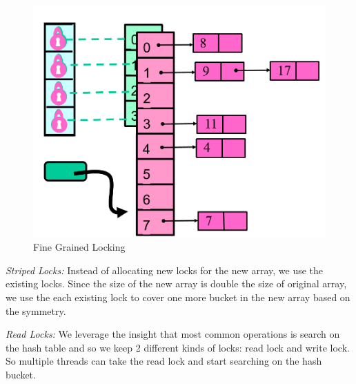 \documentclass[twoside]{article}
\begin{document}
\begin{figure}[h]
\centering
\includegraphics[scale=0.25]{Fine}
\caption{Fine Grained Locking}
\label{fig:1}
\end{figure}

\emph{Striped Locks:} Instead of allocating new locks for the new array, we use the existing locks. Since the size of the new array is double the size of original array, we use the each existing lock to cover one more bucket in the new array based on the symmetry.  

\emph{Read Locks:} We leverage the insight that most common operations is search on the hash table and so we keep 2 different kinds of locks: read lock and write lock. So multiple threads can take the read lock and start searching on the hash bucket.
\end{document}
